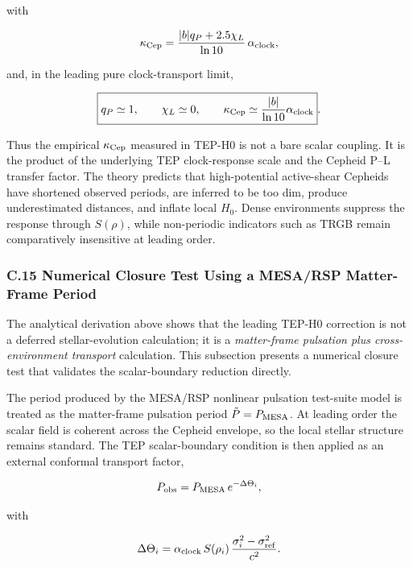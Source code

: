 \documentclass[
]{article}
\begin{document}
with

\begin{equation}
\kappa_{\rm Cep} = \frac{|b|q_P + 2.5\chi_L}{\ln 10}\,\alpha_{\rm clock} ,
\end{equation}

and, in the leading pure clock-transport limit,

\begin{equation}
\boxed{q_P \simeq 1,\qquad \chi_L \simeq 0,\qquad \kappa_{\rm Cep} \simeq \frac{|b|}{\ln 10}\alpha_{\rm clock}} .
\end{equation}

Thus the empirical \(\kappa_{\rm Cep}\) measured in TEP-H0 is not a bare
scalar coupling. It is the product of the underlying TEP clock-response
scale and the Cepheid P--L transfer factor. The theory predicts that
high-potential active-shear Cepheids have shortened observed periods,
are inferred to be too dim, produce underestimated distances, and
inflate local \(H_0\). Dense environments suppress the response through
\(S(\rho)\), while non-periodic indicators such as TRGB remain
comparatively insensitive at leading order.

\subsubsection{C.15 Numerical Closure Test Using a MESA/RSP Matter-Frame
Period}\label{c.15-numerical-closure-test-using-a-mesarsp-matter-frame-period}

The analytical derivation above shows that the leading TEP-H0 correction
is not a deferred stellar-evolution calculation; it is a
\emph{matter-frame pulsation plus cross-environment transport}
calculation. This subsection presents a numerical closure test that
validates the scalar-boundary reduction directly.

The period produced by the MESA/RSP nonlinear pulsation test-suite model
is treated as the matter-frame pulsation period
\(\tilde P = P_{\rm MESA}\). At leading order the scalar field is
coherent across the Cepheid envelope, so the local stellar structure
remains standard. The TEP scalar-boundary condition is then applied as
an external conformal transport factor,

\begin{equation}
P_{\rm obs} = P_{\rm MESA}\,e^{-\Delta\Theta_i},
\end{equation}

with

\begin{equation}
\Delta\Theta_i = \alpha_{\rm clock}\,S(\rho_i)\,\frac{\sigma_i^2 - \sigma_{\rm ref}^2}{c^2}.
\end{equation}
\end{document}

